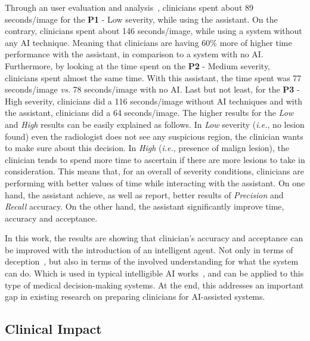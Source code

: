 Through an user evaluation and analysis~\cite{https://doi.org/10.13140/rg.2.2.16566.14403/1}, clinicians spent about 89 seconds/image for the {\bf P1} - Low severity, while using the assistant.
On the contrary, clinicians spent about 146 seconds/image, while using a system without any \ac{AI} technique.
Meaning that clinicians are having 60\% more of higher time performance with the assistant, in comparison to a system with no \ac{AI}.
Furthermore, by looking at the time spent on the {\bf P2} - Medium severity, clinicians spent almost the same time.
With this assistant, the time spent was 77 seconds/image {\it vs.} 78 seconds/image with no \ac{AI}.
Last but not least, for the {\bf P3} - High severity, clinicians did a 116 seconds/image without \ac{AI} techniques and with the assistant, clinicians did a 64 seconds/image.
The higher results for the {\it Low} and {\it High} results can be easily explained as follows.
In {\it Low} severity ({\it i.e.}, no lesion found) even the radiologist does not see any suspicious region, the clinician wants to make sure about this decision.
In {\it High} ({\it i.e.}, presence of malign lesion), the clinician tends to spend more time to ascertain if there are more lesions to take in consideration.
This means that, for an overall of severity conditions, clinicians are performing with better values of time while interacting with the assistant.
On one hand, the assistant achieve, as well as report, better results of {\it Precision} and {\it Recall} accuracy.
On the other hand, the assistant significantly improve time, accuracy and acceptance.

In this work, the results are showing that clinician's accuracy and acceptance can be improved with the introduction of an intelligent agent.
Not only in terms of deception~\cite{hengstler2016applied}, but also in terms of the involved understanding for what the system can do.
Which is used in typical intelligible \ac{AI} works~\cite{Abdul:2018:TTE:3173574.3174156}, and can be applied to this type of medical decision-making systems.
At the end, this addresses an important gap in existing research on preparing clinicians for \ac{AI}-assisted systems.

\subsection{Clinical Impact}
\label{sec:sec006007001}

